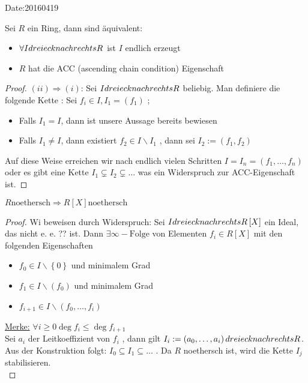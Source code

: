 \begin{bem}
\begin{bsp}
\begin{prop}
\begin{itemize}
\begin{bsp}
Date:20160419
\begin{lem}
Sei \( R \) ein Ring, dann sind \"aquivalent:
\begin{itemize}
\item \( \forall I dreieck nach rechts R \) ist \( I \) endlich erzeugt
\item \( R \) hat die ACC (ascending chain condition) Eigenschaft
\end{itemize}
\begin{proof}
\( (ii) \Rightarrow (i) \): Sei \( I dreieck nach rechts R \) beliebig.
Man definiere die folgende Kette :
Sei \( f_i \in I , I_1 = \left( f_1 \right) \) ; 
\begin{itemize}
\item Falls \( I_1=I \), dann ist unsere Aussage bereits bewiesen
\item Falls \( I_1 \neq I \), dann existiert \( f_2 \in I \backslash I_1 \) , dann sei \( I_2:= \left( f_1 ,f_2 \right) \)
\end{itemize}
Auf diese Weise erreichen wir nach endlich vielen Schritten \( I = I_n = \left( f_1, \dots , f_n \right) \) oder es gibt eine Kette \( I_1 \subsetneq I_2 \subsetneq \dots \) was ein Widerspruch zur ACC-Eigenschaft ist.
\end{proof}
\end{lem}
\begin{satz}
\( R \text{noethersch} \Rightarrow R \left[ X \right] \text{noethersch} \)
\begin{proof}
Wi beweisen durch Widerspruch:
Sei \( I dreieck nach rechts R\left[ X \right] \) ein Ideal, das nicht e. e. ?? ist.
Dann \( \exists \infty-\text{Folge} \) von Elementen \( f_i \in R \left[X \right] \) mit den folgenden Eigenschaften 
\begin{itemize}
\item \( f_0 \in I \backslash \left\lbrace 0 \right\rbrace \) und minimalem Grad
\item \( f_1 \in I \backslash \left( f_0 \right) \) und minimalem Grad
\item \( f_{i+1} \in I \backslash \left( f_0 , \dots , f_i \right) \) 
\end{itemize}
\underline{Merke:}
\( \forall i \geq 0 \deg f_i \leq \deg f_{i+1} \) \\
Sei \( a_i \) der Leitkoeffizient von \( f_ i \) , dann gilt \( I_i := \left( a_0, \dots , a_i \right) dreieck nach rechts R \).
Aus der Konstruktion folgt:
\( I_0 \subseteq I_1 \subseteq \dots \) .
Da \( R \) noethersch ist, wird die Kette \( I_j \) stabilisieren. \\

\end{proof}
\end{satz}
\end{bsp}
\end{itemize}
\end{prop}
\end{bsp}
\end{bem}
